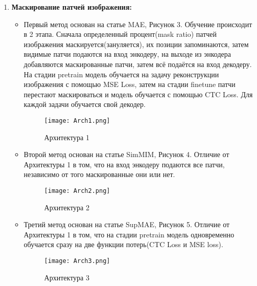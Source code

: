 \begin{enumerate}
     \item  \textbf{Маскирование патчей  изображения:}
     \begin{itemize}
          \item Первый  метод основан на статье MAE, Рисунок 3. Обучение происходит в 2 этапа. Сначала определенный процент(mask ratio) патчей изображения маскируется(зануляется), их позиции запоминаются, затем видимые патчи подаются на вход энкодеру, на выходе из энкодера добавляются маскированные патчи, затем всё подаётся на вход декодеру.
               На стадии pretrain модель обучается на задачу реконструкции изображения с помощью MSE Loss, затем на стадии finetune патчи перестают маскироваться и модель обучается с помощью CTC Loss.
               Для каждой задачи обучается свой декодер.
               \begin{figure}[H]
                    \centering
                    \texttt{[image: Arch1.png]}
                    \caption{Архитектура 1}
               \end{figure}

          \item Второй метод основан на статье SimMIM, Рисунок 4. Отличие от Архитектуры 1 в том, что на вход энкодеру подаются все патчи, независимо от того маскированные они или нет. 

          \begin{figure}[H]
               \centering
               \texttt{[image: Arch2.png]}
               \caption{Архитектура 2}
          \end{figure}

          \item Третий метод основан на статье SupMAE, Рисунок 5. Отличие от Архитектуры 1 в том, что на стадии pretrain модель одновременно обучается сразу на две функции потерь(CTC Loss и MSE loss). 

          \begin{figure}[H]
               \centering
               \texttt{[image: Arch3.png]}
               \caption{Архитектура 3}
          \end{figure}
     \end{itemize}
       

\end{enumerate}
